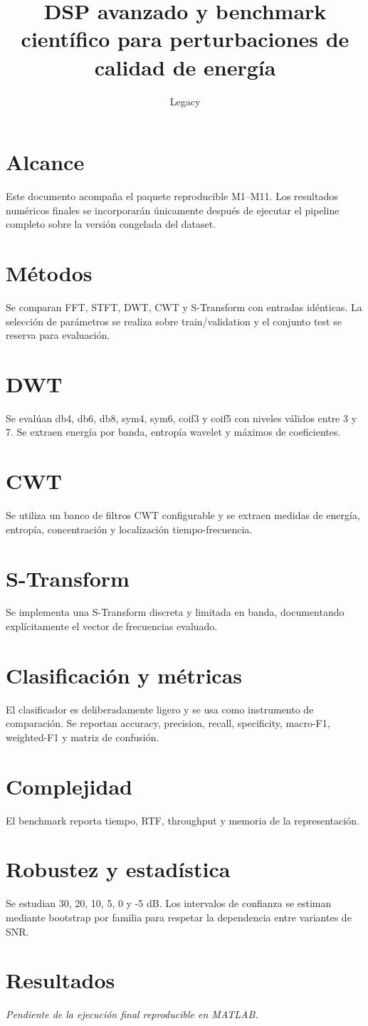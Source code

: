 \documentclass[11pt]{article}
\title{DSP avanzado y benchmark científico para perturbaciones de calidad de energía}
\author{Legacy}
\date{}
\begin{document}
\maketitle

\section{Alcance}
Este documento acompaña el paquete reproducible M1--M11. Los resultados numéricos
finales se incorporarán únicamente después de ejecutar el pipeline completo sobre
la versión congelada del dataset.

\section{Métodos}
Se comparan FFT, STFT, DWT, CWT y S-Transform con entradas idénticas. La selección
de parámetros se realiza sobre train/validation y el conjunto test se reserva para
evaluación.

\section{DWT}
Se evalúan db4, db6, db8, sym4, sym6, coif3 y coif5 con niveles válidos entre 3 y 7.
Se extraen energía por banda, entropía wavelet y máximos de coeficientes.

\section{CWT}
Se utiliza un banco de filtros CWT configurable y se extraen medidas de energía,
entropía, concentración y localización tiempo-frecuencia.

\section{S-Transform}
Se implementa una S-Transform discreta y limitada en banda, documentando
explícitamente el vector de frecuencias evaluado.

\section{Clasificación y métricas}
El clasificador es deliberadamente ligero y se usa como instrumento de comparación.
Se reportan accuracy, precision, recall, specificity, macro-F1, weighted-F1 y matriz
de confusión.

\section{Complejidad}
El benchmark reporta tiempo, RTF, throughput y memoria de la representación.

\section{Robustez y estadística}
Se estudian 30, 20, 10, 5, 0 y -5 dB. Los intervalos de confianza se estiman
mediante bootstrap por familia para respetar la dependencia entre variantes de SNR.

\section{Resultados}
\textit{Pendiente de la ejecución final reproducible en MATLAB.}
\end{document}

